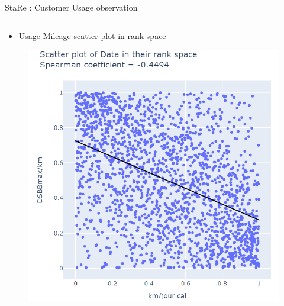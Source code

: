 \documentclass{renault-template}
\begin{document}
\begin{frame}{StaRe : Customer Usage observation}
\begin{center}
\begin{columns}[t]
      \begin{column}{0.25\textwidth}
        \begin{itemize}
        \item Usage-Mileage scatter plot in rank space
        \end{itemize}
        \begin{figure}
          \includegraphics[height=0.44\textheight]{Illustration_StaRe/usageMileageRank.png}
        \end{figure}
      \end{column}


\end{columns}
\end{center}
\end{frame}
\end{document}
